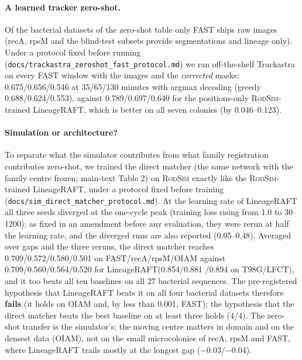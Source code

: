 \documentclass[10pt,twocolumn,letterpaper]{article}
\newcommand{\ours}{LineageRAFT\xspace}
\newcommand{\rodsim}{\textsc{RodSim}\xspace}
\begin{document}
\paragraph{A learned tracker zero-shot.}
Of the bacterial datasets of the zero-shot table only FAST ships raw images (recA, rpsM and the blind-test subsets provide segmentations and lineage only). Under a protocol fixed before running (\texttt{docs/trackastra\_zeroshot\_fast\_protocol.md}) we ran off-the-shelf Trackastra on every FAST window with the images and the \emph{corrected} masks: 0.675/0.656/0.546 at 35/65/130 minutes with argmax decoding (greedy 0.688/0.624/0.553), against 0.789/0.697/0.640 for the positions-only \rodsim-trained \ours, which is better on all seven colonies (by 0.046--0.123).

\paragraph{Simulation or architecture?}
To separate what the simulator contributes from what family registration contributes zero-shot, we trained the direct matcher (the same network with the family centre frozen; main-text Table 2) on \rodsim exactly like the \rodsim-trained \ours, under a protocol fixed before training (\texttt{docs/sim\_direct\_matcher\_protocol.md}). At the learning rate of \ours all three seeds diverged at the one-cycle peak (training loss rising from 1.0 to 30--1200); as fixed in an amendment before any evaluation, they were rerun at half the learning rate, and the diverged runs are also reported (0.05--0.48). Averaged over gaps and the three reruns, the direct matcher reaches 0.709/0.572/0.580/0.501 on FAST/recA/rpsM/OIAM against 0.709/0.560/0.564/0.520 for \ours (0.854/0.881 /0.894 on T98G/LFCT), and it too beats all ten baselines on all 27 bacterial sequences. The pre-registered hypothesis that \ours beats it on all four bacterial datasets therefore \textbf{fails} (it holds on OIAM and, by less than 0.001, FAST); the hypothesis that the direct matcher beats the best baseline on at least three holds (4/4). The zero-shot transfer is the simulator's; the moving centre matters in domain and on the densest data (OIAM), not on the small microcolonies of recA, rpsM and FAST, where \ours trails mostly at the longest gap ($-$0.03/$-$0.04).
\end{document}
